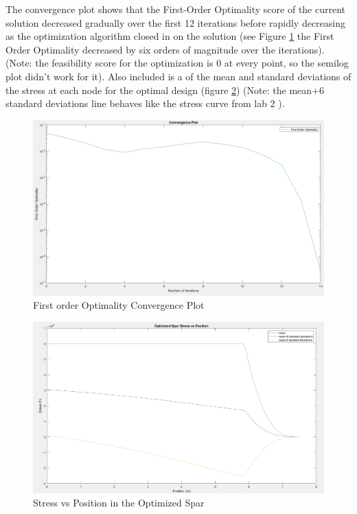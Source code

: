\documentclass[11pt]{article}%
\begin{document}
\newpage

The convergence plot shows that the First-Order Optimality score of the current solution decreased gradually over the first 12 iterations before rapidly decreasing as the optimization algorithm closed in on the solution (see Figure \ref{fig:feas}  the First Order Optimality decreased by six orders of magnitude over the iterations). (Note: the feasibility score for the optimization is 0 at every point, so the semilog plot didn't work for it). Also included is a of the mean and standard deviations of the stress at each node for the optimal design (figure \ref{fig:optstress}) (Note: the mean+6 standard deviations line behaves like the stress curve from lab 2 \cite{lab2}).

\begin{figure}[!ht]
    \centering
   \includegraphics[width=0.75\linewidth]{firstorderopt.png}
    \caption{First order Optimality Convergence Plot }
    \label{fig:feas}
\end{figure}
\newpage
\begin{figure}[h!]
    \centering
   \includegraphics[width=0.75\linewidth]{optstress.png}
    \caption{Stress vs Position in the Optimized Spar }
    \label{fig:optstress}
\end{figure}

\medskip
\end{document}

